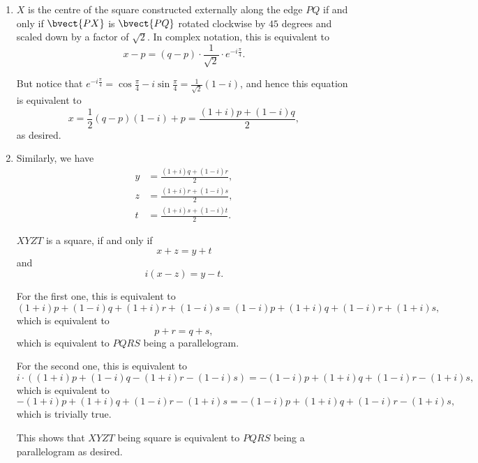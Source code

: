 \begin{enumerate}
    \item \(X\) is the centre of the square constructed externally along the edge \(PQ\) if and only if \(\bvect{PX}\) is \(\bvect{PQ}\) rotated clockwise by \(45\) degrees and scaled down by a factor of \(\sqrt{2}\). In complex notation, this is equivalent to
          \[
              x - p = (q - p) \cdot \frac{1}{\sqrt{2}} \cdot e^{-i\frac{\pi}{4}}.
          \]

          But notice that \(e^{-i\frac{\pi}{4}} = \cos \frac{\pi}{4} - i\sin\frac{\pi}{4} = \frac{1}{\sqrt{2}}(1 - i)\), and hence this equation is equivalent to
          \[
              x = \frac{1}{2} (q - p) (1 - i) + p = \frac{(1 + i)p + (1 - i)q}{2},
          \]
          as desired.
    \item Similarly, we have
          \begin{align*}
              y & = \frac{(1 + i)q + (1 - i)r}{2}, \\
              z & = \frac{(1 + i)r + (1 - i)s}{2}, \\
              t & = \frac{(1 + i)s + (1 - i)t}{2}.
          \end{align*}

          \(XYZT\) is a square, if and only if
          \[
              x + z = y + t
          \]
          and
          \[
              i(x - z) = y - t.
          \]

          For the first one, this is equivalent to
          \[
              (1 + i)p + (1 - i)q + (1 + i)r + (1 - i)s = (1 - i)p + (1 + i)q + (1 - i)r + (1 + i)s,
          \]
          which is equivalent to
          \[
              p + r = q + s,
          \]
          which is equivalent to \(PQRS\) being a parallelogram.

          For the second one, this is equivalent to
          \[
              i \cdot \left((1 + i)p + (1 - i)q - (1 + i)r - (1 - i)s\right) = -(1 - i)p + (1 + i)q + (1 - i)r - (1 + i)s,
          \]
          which is equivalent to
          \[
              -(1 + i)p + (1 + i)q + (1 - i) r -(1 + i)s = -(1 - i)p + (1 + i)q + (1 - i)r - (1 + i)s,
          \]
          which is trivially true.

          This shows that \(XYZT\) being square is equivalent to \(PQRS\) being a parallelogram as desired.

\end{enumerate}